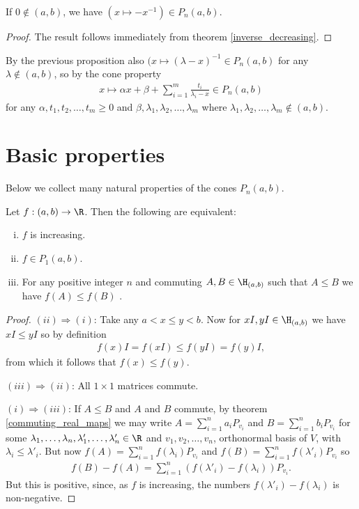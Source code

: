 \begin{prop}
	If $0 \notin (a, b)$, we have $(x \mapsto -x^{-1}) \in P_{n}(a, b)$.
\end{prop}
\begin{proof}
	The result follows immediately from theorem \ref{inverse_decreasing}.
\end{proof}

By the previous proposition also $(x \mapsto (\lambda - x)^{-1} \in P_{n}(a, b)$ for any $\lambda \notin (a, b)$, so by the cone property
\begin{align}\label{finite_pick}
	x \mapsto \alpha x + \beta + \sum_{i = 1}^{m} \frac{t_{i}}{\lambda_{i} - x} \in P_{n}(a, b)
\end{align}
for any $\alpha, t_{1}, t_{2}, \ldots, t_{m} \geq 0$ and $\beta, \lambda_{1}, \lambda_{2}, \ldots, \lambda_{m}$ where $\lambda_{1}, \lambda_{2}, \ldots, \lambda_{m} \not\in (a, b)$.

\section{Basic properties}

Below we collect many natural properties of the cones $P_{n}(a, b)$.

\begin{prop}
	Let $f : (a, b) \to \R$. Then the following are equivalent:
	\begin{enumerate}[(i)]
		\item $f$ is increasing.
		\item $f \in P_{1}(a, b)$.
		\item For any positive integer $n$ and commuting $A, B \in \H_{(a, b)}$ such that $A \leq B$ we have $f(A) \leq f(B)$ .
	\end{enumerate}
\end{prop}
\begin{proof}
	$(ii) \Rightarrow (i)$: Take any $a < x \leq y < b$. Now for $xI, yI \in \H_{(a, b)}$ we have $x I \leq y I$ so by definition
	\begin{align*}
		f(x) I = f(xI) \leq f(y I) = f(y) I,
	\end{align*}
	from which it follows that $f(x) \leq f(y)$.

	$(iii) \Rightarrow (ii)$: All $1 \times 1$ matrices commute.
	

	$(i) \Rightarrow (iii)$: If $A \leq B$ and $A$ and $B$ commute, by theorem \ref{commuting_real_maps} we may write $A = \sum_{i = 1}^{n} a_{i} P_{v_{i}}$ and $B = \sum_{i = 1}^{n} b_{i} P_{v_{i}}$ for some $\lambda_{1}, \ldots, \lambda_{n}, \lambda'_{1}, \ldots, \lambda'_{n} \in \R$ and $v_{1}, v_{2}, \ldots, v_{n}$, orthonormal basis of $V$, with $\lambda_{i} \leq \lambda'_{i}$. But now $f(A) = \sum_{i = 1}^{n} f(\lambda_{i}) P_{v_{i}}$ and $f(B) = \sum_{i = 1}^{n} f(\lambda'_{i}) P_{v_{i}}$ so
	\begin{align*}
		f(B) - f(A) = \sum_{i = 1}^{n} (f(\lambda'_{i}) - f(\lambda_{i})) P_{v_{i}}.
	\end{align*}
	But this is positive, since, as $f$ is increasing, the numbers $f(\lambda'_{i}) - f(\lambda_{i})$ is non-negative.
\end{proof}

